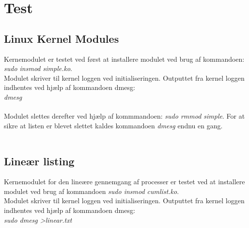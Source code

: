 \chapter{Test}
\section{Linux Kernel Modules}
Kernemodulet er testet ved først at installere modulet ved brug af kommandoen: \textit{sudo insmod simple.ko}.
\\
Modulet skriver til kernel loggen ved initialiseringen. Outputtet fra kernel loggen indhentes ved hjælp af kommandoen dmesg:\\
\textit{dmesg}
\\
\\
Modulet slettes derefter ved hjælp af kommmandoen: \textit{sudo rmmod simple}. For at sikre at listen er blevet slettet kaldes kommandoen \textit{dmesg} endnu en gang.
\\
\\
\section{Lineær listing}
Kernemodulet for den lineære gennemgang af processer er testet ved at installere modulet ved brug af kommandoen \textit{sudo insmod cumlist.ko}.
\\
Modulet skriver til kernel loggen ved initialiseringen. Outputtet fra kernel loggen indhentes ved hjælp af kommandoen dmesg:\\
\textit{sudo dmesg \textgreater linear.txt}
\\
\\
